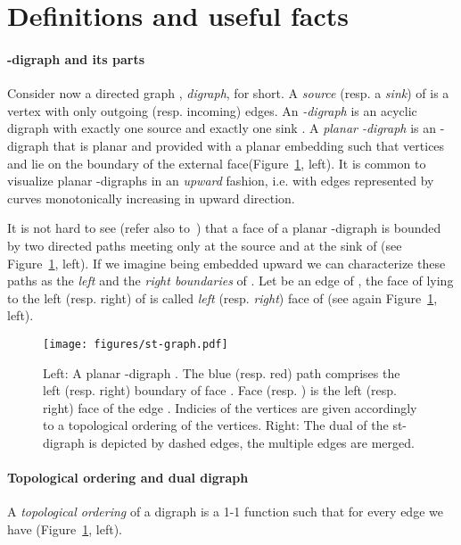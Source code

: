 \documentclass{llncs}
\begin{document}
\section{Definitions and useful facts}
\label{sec:definitions}

\paragraph{\bf -digraph and its parts} Consider now a directed graph , \emph{digraph}, for short. A \emph{source} (resp. a \emph{sink}) of   is a vertex with only outgoing  (resp. incoming) edges. An \emph{-digraph} is an acyclic digraph with exactly one source  and exactly one sink . A \emph{planar -digraph} is an -digraph that is planar and provided with a planar embedding such that vertices  and  lie on the boundary of the external face(Figure~\ref{fig:st-digraph}, left).  It is common to visualize planar -digraphs in an \emph{upward} fashion, i.e. with edges represented by curves monotonically increasing in upward direction. 

It is not hard to see (refer also to~\cite[Lemma~4.1]{diBattistaThebook}) that a face  of a planar -digraph  is bounded by two directed paths meeting only at the source and at the sink of  (see Figure~\ref{fig:st-digraph}, left).  If we imagine  being embedded upward we can characterize these paths as the \emph{left} and the \emph{right  boundaries} of . Let  be an edge of , the face of  lying to the left (resp. right) of  is called \emph{left} (resp. \emph{right}) face of  (see again Figure~\ref{fig:st-digraph}, left). 


\begin{figure}[htb]
\centering
\texttt{[image: figures/st-graph.pdf]}
\caption{Left: A planar -digraph . The blue (resp. red) path comprises the left (resp. right) boundary of face . Face  (resp. ) is the left (resp. right) face of the edge . Indicies of the vertices are given accordingly to a topological ordering of the vertices. Right: The dual  of the st-digraph  is depicted by dashed edges, the multiple edges are merged. }
\label{fig:st-digraph}
\end{figure}


\paragraph{\bf Topological ordering and dual digraph} A \emph{topological ordering} of a digraph   is a 1-1 function  such that for every edge  we have  (Figure~\ref{fig:st-digraph}, left).
\end{document}
